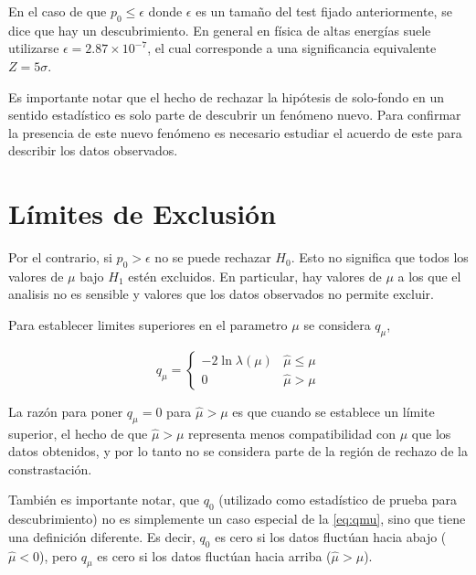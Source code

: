En el caso de que $p_0 \leq \epsilon$ donde $\epsilon$ es un tamaño del test
fijado anteriormente, se dice que hay un descubrimiento. En general en física de
altas energías suele utilizarse $\epsilon = 2.87 \times 10^{-7}$, el cual
corresponde a una significancia equivalente $Z=5\sigma$.

Es importante notar que el hecho de rechazar la hipótesis de solo-fondo en un
sentido estadístico es solo parte de descubrir un fenómeno nuevo.
Para confirmar la presencia de este nuevo fenómeno es necesario estudiar
el acuerdo de este para describir los datos observados.


\section{Límites de Exclusión}

Por el contrario, si $p_0> \epsilon$ no se puede rechazar $H_0$. Esto no
significa que todos los valores de $\mu$ bajo $H_1$ estén excluidos.
En particular, hay valores de $\mu$ a los que el analisis no es sensible
y valores que los datos observados no permite excluir.

Para establecer limites superiores en el parametro $\mu$ se considera
$q_\mu$,

\begin{equation}
  q_\mu =
  \begin{cases}
    -2 \ln \lambda(\mu) & \hat{\mu} \leq \mu \\
    0 & \hat{\mu} > \mu
  \end{cases} \label{eq:qmu}
\end{equation}

La razón para poner $q_\mu = 0$ para $\hat{\mu} > \mu$ es que cuando se
establece un límite superior, el hecho de que $\hat{\mu} > \mu$ representa menos
compatibilidad con $\mu$ que los datos obtenidos, y por lo tanto no se considera
parte de la región de rechazo de la constrastación.

También es importante notar, que $q_0$ (utilizado como estadístico de prueba para
descubrimiento) no es simplemente un caso especial de la
\cref{eq:qmu}, sino que tiene una definición diferente. Es decir, $q_0$ es cero
si los datos fluctúan hacia abajo ($\hat{\mu}<0$), pero $q_\mu$ es cero si los
datos fluctúan hacia arriba ($\hat{\mu}>\mu$).


